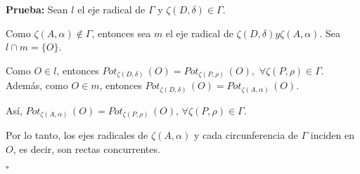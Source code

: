 \documentclass[12pt]{beamer}
\theoremstyle{definition}
\newenvironment{pba}{\noindent\textbf{Prueba:}}{\begin{flushright} $\square$
\end{flushright}}
\begin{document}
\begin{frame}
\begin{pba}
Sean $l$ el eje radical de $\Gamma$ y $\zeta(D, \delta) \in \Gamma.$

Como $\zeta(A, \alpha) \notin \Gamma$, entonces sea $m$ el eje radical de  $\zeta(D, \delta) y \zeta(A, \alpha)$. Sea $l \cap m = \{O\}$. 

\vspace{0.3cm}

Como $O \in l$, entonces $Pot_{\zeta(D, \delta)} \, (O) = Pot_{\zeta(P, \rho)} \, (O),$ $\forall \zeta(P, \rho) \in \Gamma$.  Además, como $O \in m$, entonces $Pot_{\zeta(D, \delta)} \, (O) = Pot_{\zeta(A, \alpha)} \, (O)$. 

\vspace{0.3cm}

Así, $Pot_{\zeta(A, \alpha)} \, (O) = Pot_{\zeta(P, \rho)} \, (O), \, \forall \zeta(P, \rho) \in \Gamma$.

Por lo tanto, los ejes radicales de $\zeta (A, \alpha)$ y cada circunferencia de $\Gamma$ inciden en $O$, es decir, son rectas concurrentes.
\end{pba}
\end{frame}
\end{document}
